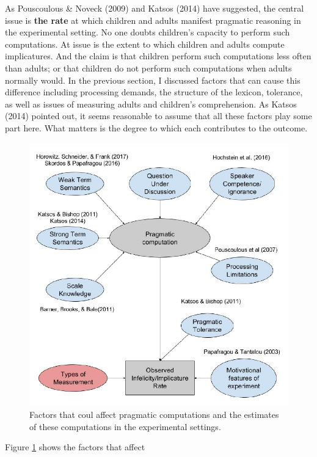 \documentclass[oneside]{report}
\theoremstyle{definition}
\theoremstyle{definition}
\theoremstyle{definition}
\theoremstyle{remark}
\begin{document}
As Pouscoulous \& Noveck (2009) and Katsos (2014) have suggested, the
central issue is \textbf{the rate} at which children and adults manifest
pragmatic reasoning in the experimental setting. No one doubts
children's capacity to perform such computations. At issue is the extent
to which children and adults compute implicatures. And the claim is that
children perform such computations less often than adults; or that
children do not perform such computations when adults normally would. In
the previous section, I discussed factors that can cause this difference
including processing demands, the structure of the lexicon, tolerance,
as well as issues of measuring adults and children's comprehension. As
Katsos (2014) pointed out, it seems reasonable to assume that all these
factors play some part here. What matters is the degree to which each
contributes to the outcome.
\begin{figure}[t]

{\centering \includegraphics{figs/implicatureGraph-1} 

}

\caption{Factors that coul affect pragmatic computations and the estimates of these computations in the experimental settings.}\label{fig:implicatureGraph}
\end{figure}
Figure \ref{fig:implicatureGraph} shows the factors that affect
\end{document}
